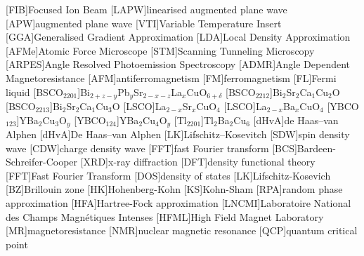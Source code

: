 
[FIB]{Focused Ion Beam}
[LAPW]{linearised augmented plane wave}
[APW]{augmented plane wave}
[VTI]{Variable Temperature Insert}
[GGA]{Generalised Gradient Approximation}
[LDA]{Local Density Approximation}
[AFMe]{Atomic Force Microscope}
[STM]{Scanning Tunneling Microscopy}
[ARPES]{Angle Resolved Photoemission Spectroscopy}
[ADMR]{Angle Dependent Magnetoresistance}
[AFM]{antiferromagnetism}
[FM]{ferromagnetism}
[FL]{Fermi liquid}
[BSCO$_{2201}$]{Bi$_{2+z-y}$Pb$_{y}$Sr$_{2-x-z}$La$_{x}$CuO$_{6+\delta}$}
[BSCO$_{2212}$]{Bi$_2$Sr$_2$Ca$_1$Cu$_2$O}
[BSCO$_{2213}$]{Bi$_2$Sr$_2$Ca$_1$Cu$_3$O}
[LSCO]{La$_{2-x}$Sr$_x$CuO$_4$}
[LSCO]{La$_{2-x}$Ba$_x$CuO$_4$}
[YBCO$_{123}$]{YBa$_2$Cu$_3$O$_y$}
[YBCO$_{124}$]{YBa$_2$Cu$_4$O$_y$}
[Tl$_{2201}$]{Tl$_2$Ba$_2$Cu$_6$}
[dHvA]{de Haas--van Alphen}
[dHvA]{De Haas--van Alphen}
[LK]{Lifschitz--Kosevitch}
[SDW]{spin density wave}
[CDW]{charge density wave}
[FFT]{fast Fourier transform}
[BCS]{Bardeen-Schreifer-Cooper}
[XRD]{x-ray diffraction}
[DFT]{density functional theory}
[FFT]{Fast Fourier Transform}
[DOS]{density of states}
[LK]{Lifschitz-Kosevich}
[BZ]{Brillouin zone}
[HK]{Hohenberg-Kohn}
[KS]{Kohn-Sham}
[RPA]{random phase approximation}
[HFA]{Hartree-Fock approximation}
[LNCMI]{Laboratoire National des Champs Magn\'{e}tiques Intenses} 
[HFML]{High Field Magnet Laboratory}
[MR]{magnetoresistance}
[NMR]{nuclear magnetic resonance}
[QCP]{quantum critical point}


